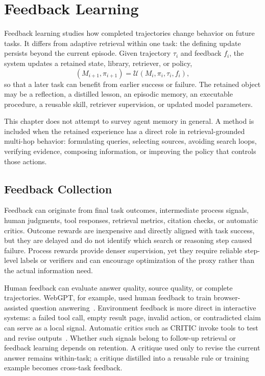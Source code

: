\section{Feedback Learning}
\label{sec:feedback_learning}

Feedback learning studies how completed trajectories change behavior on future tasks. It differs from adaptive retrieval within one task: the defining update persists beyond the current episode. Given trajectory $\tau_i$ and feedback $f_i$, the system updates a retained state, library, retriever, or policy,
\[
(M_{i+1},\pi_{i+1})=\mathcal{U}(M_i,\pi_i,\tau_i,f_i),
\]
so that a later task can benefit from earlier success or failure. The retained object may be a reflection, a distilled lesson, an episodic memory, an executable procedure, a reusable skill, retriever supervision, or updated model parameters.

This chapter does not attempt to survey agent memory in general. A method is included when the retained experience has a direct role in retrieval-grounded multi-hop behavior: formulating queries, selecting sources, avoiding search loops, verifying evidence, composing information, or improving the policy that controls those actions.

\subsection{Feedback Collection}
\label{subsec:feedback_collection}

Feedback can originate from final task outcomes, intermediate process signals, human judgments, tool responses, retrieval metrics, citation checks, or automatic critics. Outcome rewards are inexpensive and directly aligned with task success, but they are delayed and do not identify which search or reasoning step caused failure. Process rewards provide denser supervision, yet they require reliable step-level labels or verifiers and can encourage optimization of the proxy rather than the actual information need.

Human feedback can evaluate answer quality, source quality, or complete trajectories. WebGPT, for example, used human feedback to train browser-assisted question answering~\cite{nakano2021webgpt}. Environment feedback is more direct in interactive systems: a failed tool call, empty result page, invalid action, or contradicted claim can serve as a local signal. Automatic critics such as CRITIC invoke tools to test and revise outputs~\cite{gou2024critic}. Whether such signals belong to follow-up retrieval or feedback learning depends on retention. A critique used only to revise the current answer remains within-task; a critique distilled into a reusable rule or training example becomes cross-task feedback.

